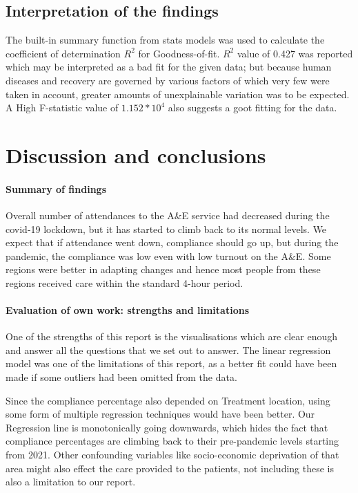\documentclass[11pt,a4paper]{article}
\begin{document}
\subsection{Interpretation of the findings}

The built-in summary function from stats models was used to calculate the coefficient of determination $R^2$ for Goodness-of-fit. $R^2$ value of 0.427 was reported which may be interpreted as a bad fit for the given data; but because human diseases and recovery are governed by various factors of which very few were taken in account, greater amounts of unexplainable variation was to be expected. A High F-statistic value of $1.152 * 10^4$ also suggests a goot fitting for the data.



\section{Discussion and conclusions}

\paragraph{Summary of findings}
Overall number of attendances to the A\&E service had decreased during the covid-19 lockdown, but it has started to climb back to its normal levels. We expect that if attendance went down, compliance should go up, but during the pandemic, the compliance was low even with low turnout on the A\&E. Some regions were better in adapting changes and hence most people from these regions received care within the standard 4-hour period.

\paragraph{Evaluation of own work: strengths and limitations}
One of the strengths of this report is the visualisations which are clear enough and answer all the questions that we set out to answer.
The linear regression model was one of the limitations of this report, as a better fit could have been made if some outliers had been omitted from the data.

Since the compliance percentage also depended on Treatment location, using some form of multiple regression techniques would have been better. Our Regression line is monotonically going downwards, which hides the fact that compliance percentages are climbing back to their pre-pandemic levels starting from 2021.
Other confounding variables like socio-economic deprivation of that area might also effect the care provided to the patients, not including these is also a limitation to our report.
\end{document}

